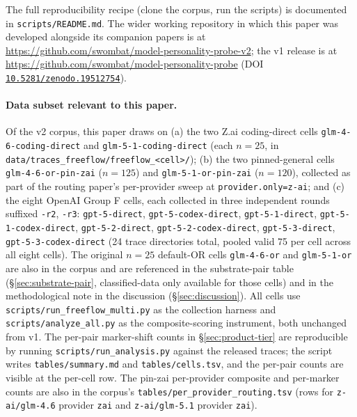 \documentclass[11pt,a4paper]{article}
\begin{document}
The full reproducibility recipe (clone the corpus, run the scripts) is documented in \texttt{scripts/\allowbreak README.md}. The wider working repository in which this paper was developed alongside its companion papers is at \url{https://github.com/swombat/model-personality-probe-v2}; the v1 release is at \url{https://github.com/swombat/model-personality-probe} (DOI \href{https://doi.org/10.5281/zenodo.19512754}{\texttt{10.5281/\allowbreak zenodo.19512754}}).

\begin{sloppypar}
\paragraph{Data subset relevant to this paper.} Of the v2 corpus, this paper draws on (a) the two Z.ai coding-direct cells \texttt{glm-4-6\allowbreak-coding\allowbreak-direct} and \texttt{glm-5-1\allowbreak-coding\allowbreak-direct} (each $n{=}25$, in \texttt{data/traces\_freeflow/\allowbreak freeflow\_<cell>/}); (b) the two pinned-general cells \texttt{glm-4-6\allowbreak-or\allowbreak-pin-zai} ($n{=}125$) and \texttt{glm-5-1\allowbreak-or\allowbreak-pin-zai} ($n{=}120$), collected as part of the routing paper's per-provider sweep at \texttt{provider.only=z-ai}; and (c) the eight OpenAI Group F cells, each collected in three independent rounds suffixed \texttt{-r2}, \texttt{-r3}: \texttt{gpt-5\allowbreak-direct}, \texttt{gpt-5\allowbreak-codex\allowbreak-direct}, \texttt{gpt-5-1\allowbreak-direct}, \texttt{gpt-5-1\allowbreak-codex\allowbreak-direct}, \texttt{gpt-5-2\allowbreak-direct}, \texttt{gpt-5-2\allowbreak-codex\allowbreak-direct}, \texttt{gpt-5-3\allowbreak-direct}, \texttt{gpt-5-3\allowbreak-codex\allowbreak-direct} (24 trace directories total, pooled valid 75 per cell across all eight cells). The original $n{=}25$ default-OR cells \texttt{glm-4-6\allowbreak-or} and \texttt{glm-5-1\allowbreak-or} are also in the corpus and are referenced in the substrate-pair table (\S\ref{sec:substrate-pair}, classified-data only available for those cells) and in the methodological note in the discussion (\S\ref{sec:discussion}). All cells use \texttt{scripts/run\_freeflow\_multi.py} as the collection harness and \texttt{scripts/analyze\_all.py} as the composite-scoring instrument, both unchanged from v1. The per-pair marker-shift counts in \S\ref{sec:product-tier} are reproducible by running \texttt{scripts/run\_analysis.py} against the released traces; the script writes \texttt{tables/summary.md} and \texttt{tables/cells.tsv}, and the per-pair counts are visible at the per-cell row. The pin-zai per-provider composite and per-marker counts are also in the corpus's \texttt{tables/per\_provider\_routing.tsv} (rows for \texttt{z-ai/glm-4.6} provider \texttt{zai} and \texttt{z-ai/glm-5.1} provider \texttt{zai}).
\end{sloppypar}
\end{document}
